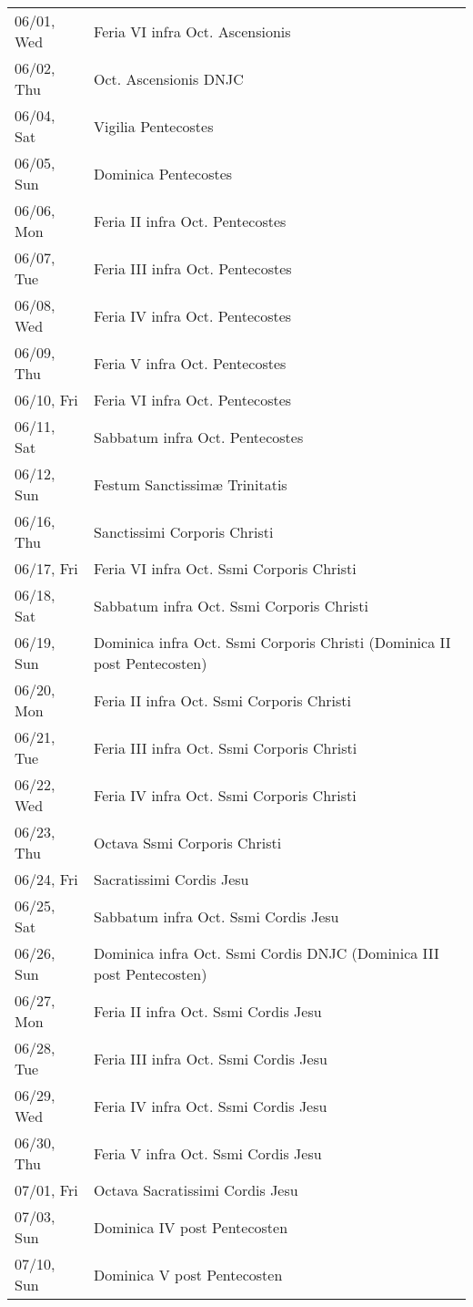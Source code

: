 \documentclass{article}
\begin{document}
\begin{longtable}{ll}
06/01, Wed & Feria VI infra Oct. Ascensionis\\
06/02, Thu & Oct. Ascensionis DNJC\\
06/04, Sat & Vigilia Pentecostes\\
06/05, Sun & Dominica Pentecostes\\
06/06, Mon & Feria II infra Oct. Pentecostes\\
06/07, Tue & Feria III infra Oct. Pentecostes\\
06/08, Wed & Feria IV infra Oct. Pentecostes\\
06/09, Thu & Feria V infra Oct. Pentecostes\\
06/10, Fri & Feria VI infra Oct. Pentecostes\\
06/11, Sat & Sabbatum infra Oct. Pentecostes\\
06/12, Sun & Festum Sanctissimæ Trinitatis\\
06/16, Thu & Sanctissimi Corporis Christi\\
06/17, Fri & Feria VI infra Oct. Ssmi Corporis Christi\\
06/18, Sat & Sabbatum infra Oct. Ssmi Corporis Christi\\
06/19, Sun & Dominica infra Oct. Ssmi Corporis Christi (Dominica II post Pentecosten)\\
06/20, Mon & Feria II infra Oct. Ssmi Corporis Christi\\
06/21, Tue & Feria III infra Oct. Ssmi Corporis Christi\\
06/22, Wed & Feria IV infra Oct. Ssmi Corporis Christi\\
06/23, Thu & Octava Ssmi Corporis Christi\\
06/24, Fri & Sacratissimi Cordis Jesu\\
06/25, Sat & Sabbatum infra Oct. Ssmi Cordis Jesu\\
06/26, Sun & Dominica infra Oct. Ssmi Cordis DNJC (Dominica III post Pentecosten)\\
06/27, Mon & Feria II infra Oct. Ssmi Cordis Jesu\\
06/28, Tue & Feria III infra Oct. Ssmi Cordis Jesu\\
06/29, Wed & Feria IV infra Oct. Ssmi Cordis Jesu\\
06/30, Thu & Feria V infra Oct. Ssmi Cordis Jesu\\
07/01, Fri & Octava Sacratissimi Cordis Jesu\\
07/03, Sun & Dominica IV post Pentecosten\\
07/10, Sun & Dominica V post Pentecosten\\

\end{longtable}
\end{document}
